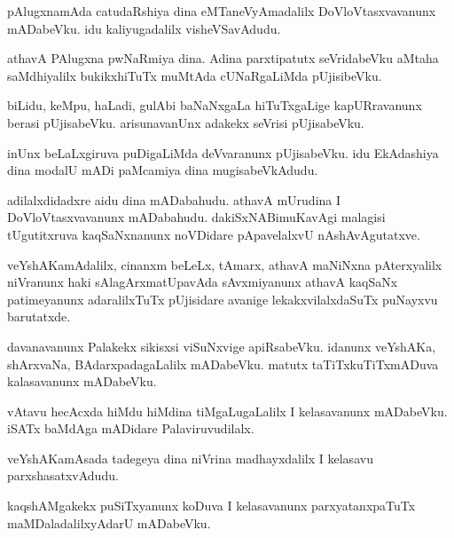 \documentclass{article}
\begin{document}
\begin{mn}%
pAlugxnamAda catudaRshiya dina eMTaneVyAmadalilx DoVloVtasxvavanunx mADabeVku. idu 
kaliyugadalilx visheVSavAdudu.
\end{mn}

\begin{mn}%
athavA PAlugxna pwNaRmiya dina. Adina parxtipatutx seVridabeVku aMtaha saMdhiyalilx 
bukikxhiTuTx muMtAda cUNaRgaLiMda pUjisibeVku.
\end{mn}

\begin{mn}%
biLidu, keMpu, haLadi, gulAbi baNaNxgaLa hiTuTxgaLige kapURravanunx berasi pUjisabeVku. 
arisunavanUnx adakekx seVrisi pUjisabeVku.
\end{mn}

\begin{mn}%
inUnx beLaLxgiruva puDigaLiMda deVvaranunx pUjisabeVku. idu EkAdashiya dina modalU mADi 
paMcamiya dina mugisabeVkAdudu.
\end{mn}

\begin{mn}%
adilalxdidadxre aidu dina mADabahudu. athavA mUrudina I DoVloVtasxvavanunx mADabahudu. 
dakiSxNABimuKavAgi malagisi tUgutitxruva kaqSaNxnanunx noVDidare pApavelalxvU 
nAshAvAgutatxve.
\end{mn}

\begin{mn}%
veYshAKamAdalilx, cinanxm beLeLx, tAmarx, athavA maNiNxna pAterxyalilx niVranunx haki 
sAlagArxmatUpavAda sAvxmiyanunx athavA kaqSaNx patimeyanunx adaralilxTuTx pUjisidare 
avanige lekakxvilalxdaSuTx puNayxvu barutatxde.
\end{mn}

\begin{mn}%
davanavanunx Palakekx sikisxsi viSuNxvige apiRsabeVku. idanunx veYshAKa, shArxvaNa, 
BAdarxpadagaLalilx mADabeVku. matutx taTiTxkuTiTxmADuva kalasavanunx mADabeVku.
\end{mn}

\begin{mn}%
vAtavu hecAcxda hiMdu  hiMdina tiMgaLugaLalilx I kelasavanunx mADabeVku. iSATx baMdAga 
mADidare Palaviruvudilalx.
\end{mn}

\begin{mn}%
veYshAKamAsada tadegeya dina niVrina madhayxdalilx I kelasavu parxshasatxvAdudu.
\end{mn}

\begin{mn}%
kaqshAMgakekx puSiTxyanunx koDuva I kelasavanunx parxyatanxpaTuTx maMDaladalilxyAdarU 
mADabeVku.
\end{mn}
\end{document}

